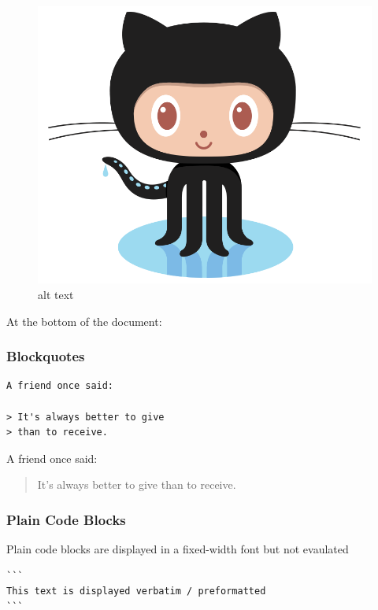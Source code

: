 \documentclass[]{book}
\begin{document}
\begin{figure}
\centering
\includegraphics{images/octocat.png}
\caption{alt text}
\end{figure}

At the bottom of the document:

\hypertarget{blockquotes}{%
\subsubsection{Blockquotes}\label{blockquotes}}

\begin{verbatim}
A friend once said:

> It's always better to give
> than to receive.
\end{verbatim}

A friend once said:

\begin{quote}
It's always better to give
than to receive.
\end{quote}

\hypertarget{plain-code-blocks}{%
\subsubsection{Plain Code Blocks}\label{plain-code-blocks}}

Plain code blocks are displayed in a fixed-width font but not evaulated

\begin{verbatim}
```
This text is displayed verbatim / preformatted
```
\end{verbatim}
\end{document}
